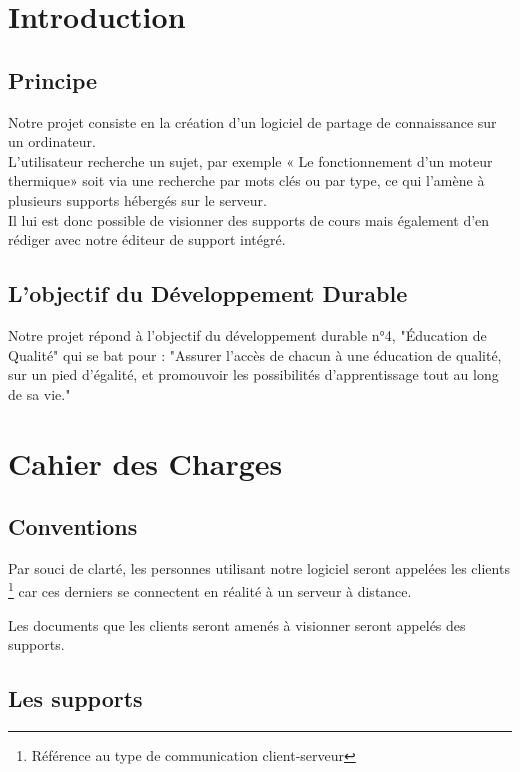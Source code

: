 {\newcommand{\cl}{client }
\newcommand{\cls}{clients }

\chapter{Introduction}

\section{Principe}

Notre projet consiste en la création d’un logiciel de partage de connaissance sur un ordinateur.\\
L’utilisateur recherche un sujet, par exemple « Le fonctionnement d'un moteur thermique» soit via une recherche par mots clés ou par type, ce qui l’amène à plusieurs supports hébergés sur le serveur.\\
Il lui est donc possible de visionner des supports de cours mais également d'en rédiger avec notre éditeur de support intégré.

\section{L'objectif du Développement Durable}

Notre projet répond à l'objectif du développement durable n°4, "Éducation de Qualité" qui se bat pour : "Assurer l'accès de chacun à une éducation de qualité, sur un pied d'égalité, et promouvoir les possibilités d'apprentissage tout au long de sa vie."

\chapter{Cahier des Charges}

\section{Conventions}

Par souci de clarté, les personnes utilisant notre logiciel seront appelées les \cls \footnote{Référence au type de communication client-serveur} car ces derniers se connectent en réalité à un serveur à distance.

Les documents que les \cls seront amenés à visionner seront appelés des supports.

\section{Les supports}

}
